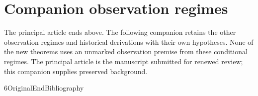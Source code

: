 

\appendix
\section*{Companion observation regimes}
The principal article ends above. The following companion retains the
other observation regimes and historical derivations with their own
hypotheses. None of the new theorems uses an unmarked observation premise
from these conditional regimes. The principal article is the manuscript
submitted for renewed review; this companion supplies preserved background.
















\let\VPreviousSection\section
\def\section#1{\let\section\VPreviousSection
\section{Convex twist suspensions: six conditional laws and four raw laws}}







\let\V86OriginalEndBibliography\endthebibliography
\def\endthebibliography{\V86OriginalEndBibliography}


